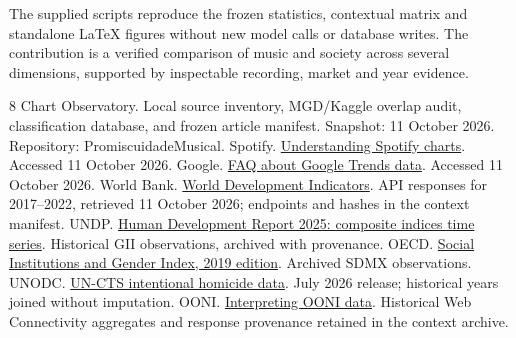 \documentclass[10pt,a4paper,twocolumn]{article}
\begin{document}
The supplied scripts reproduce the frozen statistics, contextual matrix and standalone LaTeX figures without new model calls or database writes. The contribution is a verified comparison of music and society across several dimensions, supported by inspectable recording, market and year evidence.

\begingroup\scriptsize
\begin{thebibliography}{8}
\setlength{\itemsep}{1pt}\setlength{\parskip}{0pt}
 Chart Observatory. Local source inventory, MGD/Kaggle overlap audit, classification database, and frozen article manifest. Snapshot: 11 October 2026. Repository: PromiscuidadeMusical.
 Spotify. \href{https://support.spotify.com/us/artists/article/understanding-spotify-charts/}{Understanding Spotify charts}. Accessed 11 October 2026.
 Google. \href{https://support.google.com/trends/answer/4365533?hl=en}{FAQ about Google Trends data}. Accessed 11 October 2026.
 World Bank. \href{https://data.worldbank.org/}{World Development Indicators}. API responses for 2017--2022, retrieved 11 October 2026; endpoints and hashes in the context manifest.
 UNDP. \href{https://hdr.undp.org/data-center/documentation-and-downloads}{Human Development Report 2025: composite indices time series}. Historical GII observations, archived with provenance.
 OECD. \href{https://www.oecd.org/en/topics/sub-issues/social-institutions-and-gender-index.html}{Social Institutions and Gender Index, 2019 edition}. Archived SDMX observations.
 UNODC. \href{https://dataunodc.un.org/dp-intentional-homicide-victims}{UN-CTS intentional homicide data}. July 2026 release; historical years joined without imputation.
 OONI. \href{https://ooni.org/support/interpreting-ooni-data/}{Interpreting OONI data}. Historical Web Connectivity aggregates and response provenance retained in the context archive.
\end{thebibliography}
\endgroup
\clearpage
\onecolumn
\end{document}
